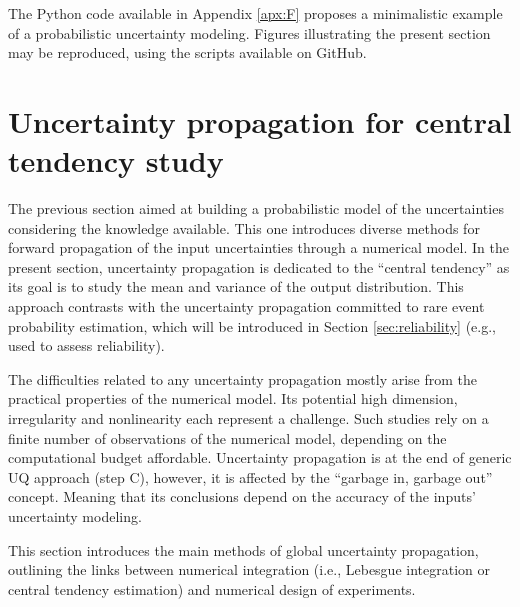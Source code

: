 \begin{otexample}
    The Python code available in Appendix \ref{apx:F} proposes a minimalistic \ot example of a probabilistic uncertainty modeling. 
    Figures illustrating the present section may be reproduced, using the \ot scripts available on GitHub\footnotemark. 
\end{otexample}

\section{Uncertainty propagation for central tendency study} \label{sec:central_propagation}
The previous section aimed at building a probabilistic model of the uncertainties considering the knowledge available. 
This one introduces diverse methods for forward propagation of the input uncertainties through a numerical model. 
In the present section, uncertainty propagation is dedicated to the ``central tendency'' as its goal is to study the mean and variance of the output distribution. 
This approach contrasts with the uncertainty propagation committed to rare event probability estimation, which will be introduced in Section \ref{sec:reliability} (e.g., used to assess reliability). 

The difficulties related to any uncertainty propagation mostly arise from the practical properties of the numerical model. 
Its potential high dimension, irregularity and nonlinearity each represent a challenge. 
Such studies rely on a finite number of observations of the numerical model, depending on the computational budget affordable.  
Uncertainty propagation is at the end of generic UQ approach (step C), however, it is affected by the ``garbage in, garbage out'' concept. 
Meaning that its conclusions depend on the accuracy of the inputs' uncertainty modeling. 

This section introduces the main methods of global uncertainty propagation, 
outlining the links between numerical integration (i.e., Lebesgue integration or central tendency estimation) and numerical design of experiments. 



